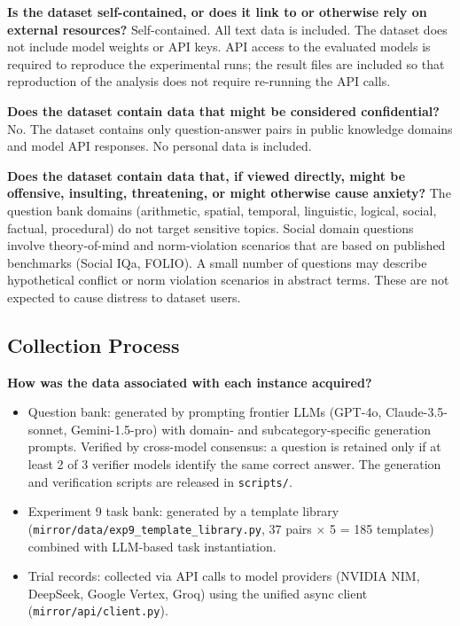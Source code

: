 \textbf{Is the dataset self-contained, or does it link to or otherwise rely on
external resources?}
Self-contained. All text data is included. The dataset does not include model weights
or API keys. API access to the evaluated models is required to reproduce the
experimental runs; the result files are included so that reproduction of the analysis
does not require re-running the API calls.

\textbf{Does the dataset contain data that might be considered confidential?}
No. The dataset contains only question-answer pairs in public knowledge domains and
model API responses. No personal data is included.

\textbf{Does the dataset contain data that, if viewed directly, might be offensive,
insulting, threatening, or might otherwise cause anxiety?}
The question bank domains (arithmetic, spatial, temporal, linguistic, logical, social,
factual, procedural) do not target sensitive topics. Social domain questions involve
theory-of-mind and norm-violation scenarios that are based on published benchmarks
(Social IQa, FOLIO). A small number of questions may describe hypothetical conflict
or norm violation scenarios in abstract terms. These are not expected to cause
distress to dataset users.

\subsection*{Collection Process}

\textbf{How was the data associated with each instance acquired?}
\begin{itemize}
  \item Question bank: generated by prompting frontier LLMs (GPT-4o, Claude-3.5-sonnet,
    Gemini-1.5-pro) with domain- and subcategory-specific generation prompts.
    Verified by cross-model consensus: a question is retained only if at least 2 of 3
    verifier models identify the same correct answer. The generation and verification
    scripts are released in \texttt{scripts/}.
  \item Experiment 9 task bank: generated by a template library
    (\texttt{mirror/data/exp9\_template\_library.py}, 37 pairs $\times$ 5 = 185 templates)
    combined with LLM-based task instantiation.
  \item Trial records: collected via API calls to model providers (NVIDIA NIM, DeepSeek,
    Google Vertex, Groq) using the unified async client (\texttt{mirror/api/client.py}).
\end{itemize}

